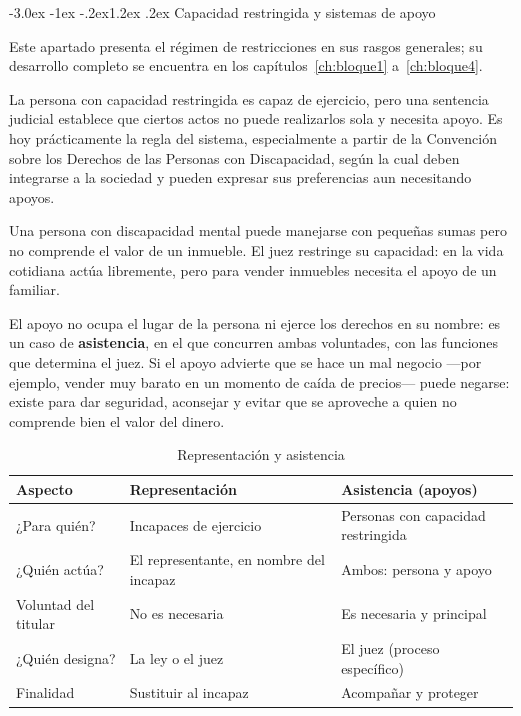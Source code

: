\documentclass[12pt,oneside]{book}
\makeatletter
\renewcommand\section{\@startsection{section}{1}{\z@}%
  {-3.0ex \@plus -1ex \@minus -.2ex}{1.2ex \@plus .2ex}%
  {\normalfont\large\bfseries\color{acento}}}
\makeatother
\begin{document}
\section{Capacidad restringida y sistemas de apoyo}

Este apartado presenta el régimen de restricciones en sus rasgos generales; su desarrollo completo se encuentra en los capítulos~\ref{ch:bloque1} a~\ref{ch:bloque4}.


La persona con capacidad restringida es capaz de ejercicio, pero una sentencia judicial establece que ciertos actos no puede realizarlos sola y necesita apoyo. Es hoy prácticamente la regla del sistema, especialmente a partir de la Convención sobre los Derechos de las Personas con Discapacidad, según la cual deben integrarse a la sociedad y pueden expresar sus preferencias aun necesitando apoyos.

\begin{ejemplo}
Una persona con discapacidad mental puede manejarse con pequeñas sumas pero no comprende el valor de un inmueble. El juez restringe su capacidad: en la vida cotidiana actúa libremente, pero para vender inmuebles necesita el apoyo de un familiar.
\end{ejemplo}

El apoyo no ocupa el lugar de la persona ni ejerce los derechos en su nombre: es un caso de \textbf{asistencia}, en el que concurren ambas voluntades, con las funciones que determina el juez. Si el apoyo advierte que se hace un mal negocio ---por ejemplo, vender muy barato en un momento de caída de precios--- puede negarse: existe para dar seguridad, aconsejar y evitar que se aproveche a quien no comprende bien el valor del dinero.

\begin{table}[H]
\centering
\begin{tabularx}{\textwidth}{B{0.22\textwidth} Y Y}
\toprule
\textbf{Aspecto} & \textbf{Representación} & \textbf{Asistencia (apoyos)} \\
\midrule
¿Para quién? & Incapaces de ejercicio & Personas con capacidad restringida \\
¿Quién actúa? & El representante, en nombre del incapaz & Ambos: persona y apoyo \\
Voluntad del titular & No es necesaria & Es necesaria y principal \\
¿Quién designa? & La ley o el juez & El juez (proceso específico) \\
Finalidad & Sustituir al incapaz & Acompañar y proteger \\
\bottomrule
\end{tabularx}
\caption{Representación y asistencia}
\end{table}
\end{document}
